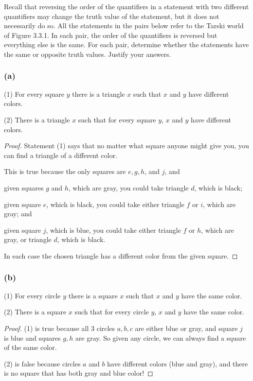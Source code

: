 \documentclass[14pt]{extarticle}
\begin{document}
Recall that reversing the order of the quantifiers in a statement with two different quantifiers may change the truth value of the statement, but it does not necessarily do so. All the statements in the pairs below refer to the Tarski world of Figure 3.3.1. In each pair, the order of the quantifiers is reversed but everything else is the same. For each pair, determine whether the statements have the same or opposite truth values. Justify your answers.

\subsubsection{(a)}
(1) For every square $y$ there is a triangle $x$ such that $x$ and $y$ have different colors.

(2) There is a triangle $x$ such that for every square $y$, $x$ and $y$ have different colors.

\begin{proof}
    Statement (1) says that no matter what square anyone might give you, you can find a triangle of a different color.

    This is true because the only squares are $e, g, h$, and $j$, and

    given squares $g$ and $h$, which are gray, you could take triangle $d$, which is black;

    given square $e$, which is black, you could take either triangle $f$ or $i$, which are gray; and

    given square $j$, which is blue, you could take either triangle $f$ or $h$, which are gray, or triangle $d$, which is black.

    In each case the chosen triangle has a different color from the given square.
\end{proof}

\subsubsection{(b)}
(1) For every circle $y$ there is a square $x$ such that $x$ and $y$ have the same color.

(2) There is a square $x$ such that for every circle $y$, $x$ and $y$ have the same color.

\begin{proof}
    (1) is true because all 3 circles $a, b, c$ are either blue or gray, and square $j$ is blue and squares $g, h$ are gray. So given any circle, we can always find a square of the same color.

    (2) is false because circles $a$ and $b$ have different colors (blue and gray), and there is no square that has both gray and blue color!
\end{proof}
\end{document}
